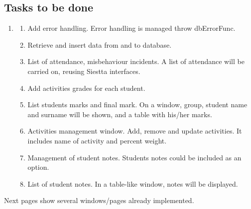 \documentclass[a4paper]{article}
\begin{document}
\subsection[Tasks to be done]{Tasks to be done}
\hypertarget{RefHeading150271801272074}{}\begin{enumerate}
\item \begin{enumerate}
\item Add error handling. Error handling is managed throw dbErrorFunc.
\item Retrieve and insert data from and to database. 
\item List of attendance, misbehaviour incidents. A list of attendance
will be carried on, reusing Siestta interfaces.
\item Add activities grades for each student. 
\item List students marks and final mark. On a window, group, student
name and surname will be shown, and a table with his/her marks.
\item Activities management window. Add, remove and update activities.
It includes name of activity and percent weight.
\item Management of student notes. Student{\textquotesingle}s notes
could be included as an option.
\item List of student notes. In a table-like window, notes will be
displayed.
\end{enumerate}
\end{enumerate}

\bigskip

Next pages show several windows/pages already implemented.
\end{document}
